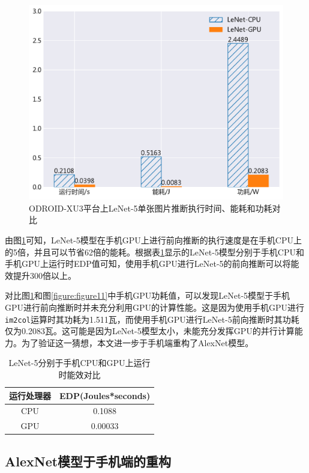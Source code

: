 \begin{figure}[htbp]
    \centering
    \includegraphics[height=0.4\textwidth]{figures/lenet_energy.pdf}
    \caption{ODROID-XU3平台上LeNet-5单张图片推断执行时间、能耗和功耗对比}\label{figure:figure16}
\end{figure}

由图\ref{figure:figure16}可知，LeNet-5模型在手机GPU上进行前向推断的执行速度是在手机CPU上的5倍，并且可以节省62倍的能耗。根据表\ref{table:table6}显示的LeNet-5模型分别于手机CPU和手机GPU上运行时EDP值可知，使用手机GPU进行LeNet-5的前向推断可以将能效提升300倍以上。

对比图\ref{figure:figure16}和图\ref{figure:figure11}中手机GPU功耗值，可以发现LeNet-5模型于手机GPU进行前向推断时并未充分利用GPU的计算性能。这是因为使用手机GPU进行\texttt{im2col}运算时其功耗为1.511瓦，而使用手机GPU进行LeNet-5前向推断时其功耗仅为0.2083瓦。这可能是因为LeNet-5模型太小，未能充分发挥GPU的并行计算能力。为了验证这一猜想，本文进一步于手机端重构了AlexNet模型。

\begin{table}[htbp]
  \centering
  \caption{LeNet-5分别于手机CPU和GPU上运行时能效对比}
  \label{table:table6}
  \begin{tabular}{cc}
    \toprule
      运行处理器 & EDP(Joules*seconds) \\
    \midrule
      CPU & 0.1088 \\
      GPU & 0.00033 \\
    \bottomrule
  \end{tabular}
\end{table}

\subsection{AlexNet模型于手机端的重构}

